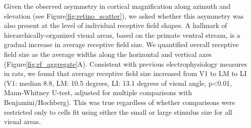 Given the observed asymmetry in cortical magnification along azimuth and elevation (see Figure\ref{fig:retino_scatter}), we asked whether this asymmetry was also present at the level of individual receptive field shapes. A hallmark of hierarchically-organized visual areas, based on the primate ventral stream, is a gradual increase in average receptive field size\cite{Rust2010SelectivityIT, Vermaercke2014, Siegle2021, Tafazoli2017}. We quantified overall receptive field size as the average widths along the horizontal and vertical axes (Figure\ref{fig:rf_aggregate}A). Consistent with previous electrophysiology measures in rats\cite{Vermaercke2014, Tafazoli2017}, we found that average receptive field size increased from V1 to LM to LI (V1: median 8.8, LM: 10.5 degrees, LI: 13.1 degrees of visual angle, p<0.01, Mann-Whitney U-test, adjusted for multiple comparisons with Benjamini/Hochberg). This was true regardless of whether comparisons were restricted only to cells fit using either the small or large stimulus size for all visual areas.  


